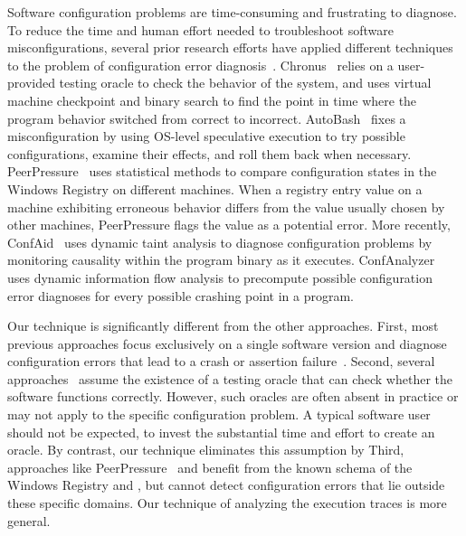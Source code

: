 Software configuration problems are time-consuming
and frustrating to diagnose. To reduce the time and human
effort needed to troubleshoot software misconfigurations,
several prior research efforts have applied different techniques
to the problem of configuration error diagnosis~\cite{Attariyan:2008:UCD, 
Whitaker:2004:CDS, Wang:2004:AMT, rangefix,
Attariyan:2010:ACT, Rabkin:2011:PPC, keller:conferr}.
Chronus~\cite{Whitaker:2004:CDS} relies on a user-provided
testing oracle to check the behavior of the system, and uses
virtual machine checkpoint and binary search to find the
point in time where the program behavior
switched from correct to incorrect. AutoBash~\cite{Su:2007:AIC}
fixes a misconfiguration by using
OS-level speculative execution to try possible
configurations, examine their effects, and roll them back when necessary.
PeerPressure~\cite{Wang:2004:AMT} 
uses statistical methods to compare
configuration states in the Windows Registry on different machines.
When a registry entry value on a machine exhibiting erroneous behavior differs
from the value usually chosen by other machines, PeerPressure
flags the value as a potential error. More recently, ConfAid~\cite{Attariyan:2010:ACT}
uses dynamic taint analysis to diagnose configuration problems 
by monitoring causality within the program binary as it executes.
ConfAnalyzer~\cite{Rabkin:2011:PPC} uses dynamic information flow analysis to precompute
possible configuration error diagnoses for every possible crashing point
in a program. 

Our technique is significantly different from the other approaches.
First, most previous approaches focus exclusively on a single software
version and diagnose configuration errors that lead to a crash or
assertion failure~\cite{Attariyan:2008:UCD, Whitaker:2004:CDS, 
Attariyan:2010:ACT, Rabkin:2011:PPC}.
Second, several approaches~\cite{Attariyan:2010:ACT, Whitaker:2004:CDS}
assume the existence of a testing oracle that can 
check whether the software functions correctly. However,
such oracles are often
absent in practice or may not apply to the specific configuration problem.
A typical software user should not be expected, to invest the substantial
time and effort to create an oracle.
By contrast, our technique eliminates this assumption by
 Third, approaches like
PeerPressure~\cite{Wang:2004:AMT} and  benefit from
the known schema of the Windows Registry and
, but cannot detect configuration errors
that lie outside these specific domains. Our technique
of analyzing the execution traces is more general.

